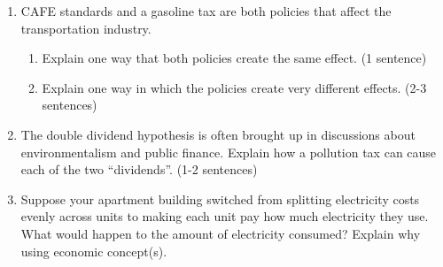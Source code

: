 \documentclass[11pt]{article}
\newcommand{\answer}[1]{\iftoggle{INCLUDEANSWERS}{{\color{violet!70!white}\textbf{Solution:} #1}}{} }
\newcommand{\points}[1]{\iftoggle{INCLUDEPOINTS}{{\color{blue!70!white}(#1 pts.)}}{}}
\begin{document}
\begin{enumerate}
  \item \points{12} CAFE standards and a gasoline tax are both policies that affect the transportation industry.
  \begin{enumerate}
    \item Explain one way that both policies create the same effect. (1 sentence)
    \item Explain one way in which the policies create very different effects. (2-3 sentences)
  \end{enumerate}

  \answer{
    \begin{enumerate}
      \item Both policies encourage investment in cleaner vehicles and both encourage driving less because of higher marginal costs

      \item Gas tax directly encourages people to drive less. Meanwhile a CAFE standard creates more efficient vehicles which has a `rebound effect' which encourages more driving. (Note: Points here for knowing and explaining the rebound effect. Since more efficient cars require less gas per mile, people end up offsetting some of the lowered pollution by driving more)
    \end{enumerate}
  }

  \item \points{12} The double dividend hypothesis is often brought up in discussions about environmentalism and public finance. Explain how a pollution tax can cause each of the two ``dividends''. (1-2 sentences)
  
  \answer{
    Dividend 1 is lowering pollution and dividend 2 is lowering distortionary taxes, such as income and sales tax.
  }
  
  \item \points{12} Suppose your apartment building switched from splitting electricity costs evenly across units to making each unit pay how much electricity they use. What would happen to the amount of electricity consumed? Explain why using economic concept(s).
  
  \answer{
    After switching to a per-unit electricity bill, people would lower energy consumption because they have to pay for their marginal energy consumption.
  }
\end{enumerate}
\end{document}
